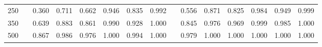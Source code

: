 % 
\begin{tabular}{ccccccccccccccc}
  \hline
  \hline
250 &  & 0.360 & 0.711 & 0.662 & 0.946 & 0.835 & 0.992 &  & 0.556 & 0.871 & 0.825 & 0.984 & 0.949 & 0.999 \\ 
  350 &  & 0.639 & 0.883 & 0.861 & 0.990 & 0.928 & 1.000 &  & 0.845 & 0.976 & 0.969 & 0.999 & 0.985 & 1.000 \\ 
  500 &  & 0.867 & 0.986 & 0.976 & 1.000 & 0.994 & 1.000 &  & 0.979 & 1.000 & 1.000 & 1.000 & 1.000 & 1.000 \\ 
   \hline
\end{tabular}
